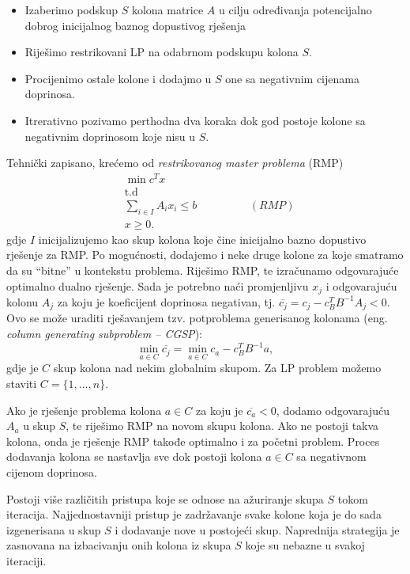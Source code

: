 \documentclass[a4paper, utf8, 11pt, colorlinks]{book}
\theoremstyle{definition}
\begin{document}
\begin{itemize}
   \item Izaberimo podskup $S$ kolona matrice $A$ u cilju određivanja potencijalno dobrog inicijalnog baznog dopustivog rješenja
    \item Riješimo restrikovani LP na odabrnom podskupu kolona $S$.
    \item Procijenimo ostale kolone i dodajmo u $S$ one sa negativnim 
          cijenama doprinosa.
    \item Itrerativno pozivamo perthodna dva koraka dok god postoje kolone   sa negativnim doprinosom koje nisu u $S$.
\end{itemize}
Tehnički zapisano, krećemo od \emph{restrikovanog master problema} (RMP)
\begin{align*}
    &\min c^T x \\
    &\mbox{t.d} \\
    & \sum_{i \in I} A_i x_i  \leq b \hspace{2cm} (RMP)\\
    & x \geq 0. 
\end{align*}
gdje $I$ inicijalizujemo kao skup kolona koje čine inicijalno bazno dopustivo rješenje  za RMP. Po mogućnosti, dodajemo i neke druge kolone za koje smatramo da su ``bitne'' u kontekstu problema.  Riješimo RMP,  te izračunamo odgovarajuće optimalno dualno rješenje. Sada je potrebno naći promjenljivu $x_j$ i odgovarajuću kolonu $A_j$ za koju je koeficijent doprinosa negativan, tj. $\overline{c_j} = c_j - c_B^T B^{-1}A_j < 0$.
Ovo se može uraditi rješavanjem tzv. potproblema generisanog kolonama (eng. \emph{column generating subproblem -- CGSP}):
$$\min_{a \in C} \overline{c_j} = \min_{a \in C} c_a - c_B^T B^{-1} a,$$
gdje je $C$ skup kolona nad nekim globalnim skupom. Za LP problem možemo staviti $C = \{1,\ldots,n\}$. 

Ako je rješenje problema kolona $a \in C$ za koju je $\overline{c_a}<0$, dodamo odgovarajuću $A_a$ u skup $S$, te riješimo  RMP na novom skupu kolona. Ako ne postoji takva kolona, onda je rješenje RMP takođe optimalno i za početni problem. %
 Proces dodavanja kolona se nastavlja sve dok postoji kolona $a\in C$ sa negativnom cijenom doprinosa. 

Postoji više različitih pristupa koje se odnose na ažuriranje skupa $S$ tokom iteracija. 
Najjednostavniji pristup je zadržavanje svake kolone koja je do sada izgenerisana  u skup $S$ i dodavanje  nove u postojeći skup. Naprednija strategija je zasnovana na izbacivanju onih kolona iz skupa $S$ koje su nebazne u svakoj iteraciji. 
\end{document}
